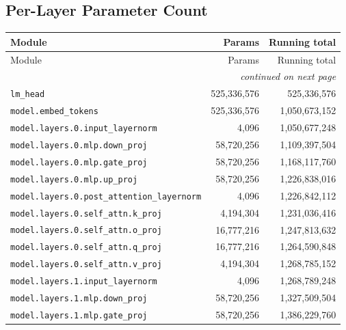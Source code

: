 \documentclass[10pt,a4paper]{article}
\theoremstyle{definition}
\begin{document}
\begin{appendices}
\section{Per-Layer Parameter Count}
\begin{longtable}{p{9.5cm}rr}
\toprule
Module & Params & Running total \\
\midrule
\endfirsthead
\toprule
Module & Params & Running total \\
\midrule
\endhead
\midrule \multicolumn{3}{r}{\textit{continued on next page}} \\
\endfoot
\bottomrule
\endlastfoot
\texttt{lm\_head} & 525,336,576 & 525,336,576 \\
\texttt{model.\allowbreak{}embed\_tokens} & 525,336,576 & 1,050,673,152 \\
\texttt{model.\allowbreak{}layers.\allowbreak{}0.\allowbreak{}input\_layernorm} & 4,096 & 1,050,677,248 \\
\texttt{model.\allowbreak{}layers.\allowbreak{}0.\allowbreak{}mlp.\allowbreak{}down\_proj} & 58,720,256 & 1,109,397,504 \\
\texttt{model.\allowbreak{}layers.\allowbreak{}0.\allowbreak{}mlp.\allowbreak{}gate\_proj} & 58,720,256 & 1,168,117,760 \\
\texttt{model.\allowbreak{}layers.\allowbreak{}0.\allowbreak{}mlp.\allowbreak{}up\_proj} & 58,720,256 & 1,226,838,016 \\
\texttt{model.\allowbreak{}layers.\allowbreak{}0.\allowbreak{}post\_attention\_layernorm} & 4,096 & 1,226,842,112 \\
\texttt{model.\allowbreak{}layers.\allowbreak{}0.\allowbreak{}self\_attn.\allowbreak{}k\_proj} & 4,194,304 & 1,231,036,416 \\
\texttt{model.\allowbreak{}layers.\allowbreak{}0.\allowbreak{}self\_attn.\allowbreak{}o\_proj} & 16,777,216 & 1,247,813,632 \\
\texttt{model.\allowbreak{}layers.\allowbreak{}0.\allowbreak{}self\_attn.\allowbreak{}q\_proj} & 16,777,216 & 1,264,590,848 \\
\texttt{model.\allowbreak{}layers.\allowbreak{}0.\allowbreak{}self\_attn.\allowbreak{}v\_proj} & 4,194,304 & 1,268,785,152 \\
\texttt{model.\allowbreak{}layers.\allowbreak{}1.\allowbreak{}input\_layernorm} & 4,096 & 1,268,789,248 \\
\texttt{model.\allowbreak{}layers.\allowbreak{}1.\allowbreak{}mlp.\allowbreak{}down\_proj} & 58,720,256 & 1,327,509,504 \\
\texttt{model.\allowbreak{}layers.\allowbreak{}1.\allowbreak{}mlp.\allowbreak{}gate\_proj} & 58,720,256 & 1,386,229,760 \\

\end{longtable}
\end{appendices}
\end{document}
